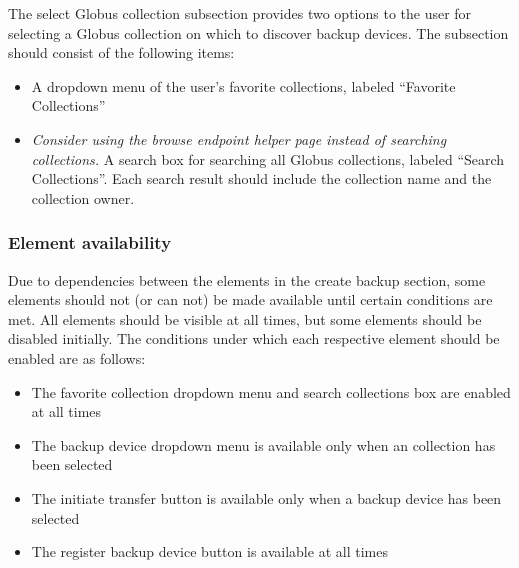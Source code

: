 The select Globus collection subsection provides two options to the user for selecting
a Globus collection on which to discover backup devices. The subsection should consist
of the following items:

\begin{itemize}\itemsep1pt
    \item A dropdown menu of the user's favorite collections, labeled ``Favorite
    Collections''
    \item \emph{Consider using the browse endpoint helper page instead of searching collections.} 
    A search box for searching all Globus collections, labeled ``Search
    Collections''. Each search result should include the collection name and the 
    collection owner. 
\end{itemize}

\subsubsection{Element availability}

Due to dependencies between the elements in the create backup section, some elements
should not (or can not) be made available until certain conditions are met. All elements 
should be visible at all times, but some elements should be disabled initially. The 
conditions under which each respective element should be enabled are as follows:

\begin{itemize}\itemsep1pt
  \item The favorite collection dropdown menu and search collections box are enabled at all times
  \item The backup device dropdown menu is available only when an collection has been
  selected
  \item The initiate transfer button is available only when a backup device has been
  selected
  \item The register backup device button is available at all times 
\end{itemize}



